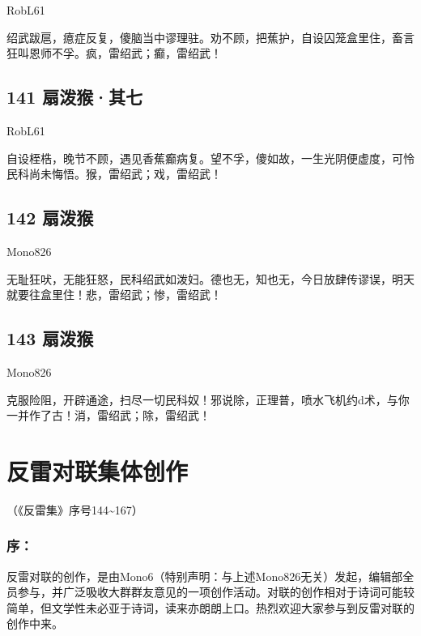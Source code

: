 {RobL61}

绍武跋扈，癔症反复，傻脑当中谬理驻。劝不顾，把蕉护，自设囚笼盒里住，畜言狂叫恩师不孚。疯，雷绍武；癫，雷绍武！

\hypertarget{ux6247ux6cfcux7334ux5176ux4e03}{%
\subsection{141 扇泼猴·其七}\label{ux6247ux6cfcux7334ux5176ux4e03}}

{RobL61}

自设桎梏，晚节不顾，遇见香蕉癫病复。望不孚，傻如故，一生光阴便虚度，可怜民科尚未悔悟。猴，雷绍武；戏，雷绍武！
~\\

\hypertarget{ux6247ux6cfcux7334-4}{%
\subsection{142 扇泼猴}\label{ux6247ux6cfcux7334-4}}

{Mono826}

无耻狂吠，无能狂怒，民科绍武如泼妇。德也无，知也无，今日放肆传谬误，明天就要往盒里住！悲，雷绍武；惨，雷绍武！
~\\

\hypertarget{ux6247ux6cfcux7334-5}{%
\subsection{143 扇泼猴}\label{ux6247ux6cfcux7334-5}}

{Mono826}

克服险阻，开辟通途，扫尽一切民科奴！邪说除，正理普，喷水飞机约d术，与你一并作了古！消，雷绍武；除，雷绍武！

\hypertarget{ux53cdux96f7ux5bf9ux8054ux96c6ux4f53ux521bux4f5c}{%
\section{反雷对联集体创作}\label{ux53cdux96f7ux5bf9ux8054ux96c6ux4f53ux521bux4f5c}}

（《反雷集》序号144\textasciitilde167）

\hypertarget{ux5e8f}{%
\subsubsection{序：}\label{ux5e8f}}

反雷对联的创作，是由Mono6（特别声明：与上述Mono826无关）发起，编辑部全员参与，并广泛吸收大群群友意见的一项创作活动。对联的创作相对于诗词可能较简单，但文学性未必亚于诗词，读来亦朗朗上口。热烈欢迎大家参与到反雷对联的创作中来。

